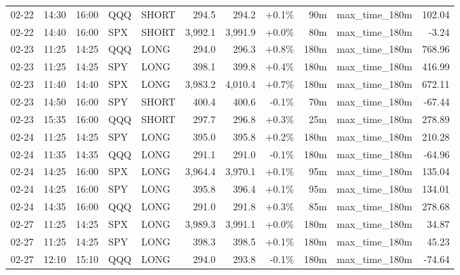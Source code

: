 \documentclass[11pt,a4paper,twoside]{article}
\begin{document}
\begin{center}
\begin{longtable}{>{\color{txtmain}}l l l l l r r r r >{\color{txtmain}}l r}
02-22 & 14:30 & 16:00 & QQQ & SHORT & 294.5 & 294.2 & \textcolor{wingreen}{+0.1\%} & 90m & max\_time\_180m & \textcolor{wingreen}{102.04} \\
02-22 & 14:40 & 16:00 & SPX & SHORT & 3,992.1 & 3,991.9 & \textcolor{wingreen}{+0.0\%} & 80m & max\_time\_180m & \textcolor{lossred}{-3.24} \\
02-23 & 11:25 & 14:25 & QQQ & LONG & 294.0 & 296.3 & \textcolor{wingreen}{+0.8\%} & 180m & max\_time\_180m & \textcolor{wingreen}{768.96} \\
02-23 & 11:25 & 14:25 & SPY & LONG & 398.1 & 399.8 & \textcolor{wingreen}{+0.4\%} & 180m & max\_time\_180m & \textcolor{wingreen}{416.99} \\
02-23 & 11:40 & 14:40 & SPX & LONG & 3,983.2 & 4,010.4 & \textcolor{wingreen}{+0.7\%} & 180m & max\_time\_180m & \textcolor{wingreen}{672.11} \\
02-23 & 14:50 & 16:00 & SPY & SHORT & 400.4 & 400.6 & \textcolor{lossred}{-0.1\%} & 70m & max\_time\_180m & \textcolor{lossred}{-67.44} \\
02-23 & 15:35 & 16:00 & QQQ & SHORT & 297.7 & 296.8 & \textcolor{wingreen}{+0.3\%} & 25m & max\_time\_180m & \textcolor{wingreen}{278.89} \\
02-24 & 11:25 & 14:25 & SPY & LONG & 395.0 & 395.8 & \textcolor{wingreen}{+0.2\%} & 180m & max\_time\_180m & \textcolor{wingreen}{210.28} \\
02-24 & 11:35 & 14:35 & QQQ & LONG & 291.1 & 291.0 & \textcolor{lossred}{-0.1\%} & 180m & max\_time\_180m & \textcolor{lossred}{-64.96} \\
02-24 & 14:25 & 16:00 & SPX & LONG & 3,964.4 & 3,970.1 & \textcolor{wingreen}{+0.1\%} & 95m & max\_time\_180m & \textcolor{wingreen}{135.04} \\
02-24 & 14:25 & 16:00 & SPY & LONG & 395.8 & 396.4 & \textcolor{wingreen}{+0.1\%} & 95m & max\_time\_180m & \textcolor{wingreen}{134.01} \\
02-24 & 14:35 & 16:00 & QQQ & LONG & 291.0 & 291.8 & \textcolor{wingreen}{+0.3\%} & 85m & max\_time\_180m & \textcolor{wingreen}{278.68} \\
02-27 & 11:25 & 14:25 & SPX & LONG & 3,989.3 & 3,991.1 & \textcolor{wingreen}{+0.0\%} & 180m & max\_time\_180m & \textcolor{wingreen}{34.87} \\
02-27 & 11:25 & 14:25 & SPY & LONG & 398.3 & 398.5 & \textcolor{wingreen}{+0.1\%} & 180m & max\_time\_180m & \textcolor{wingreen}{45.23} \\
02-27 & 12:10 & 15:10 & QQQ & LONG & 294.0 & 293.8 & \textcolor{lossred}{-0.1\%} & 180m & max\_time\_180m & \textcolor{lossred}{-74.64} \\

\end{longtable}
\end{center}
\end{document}
